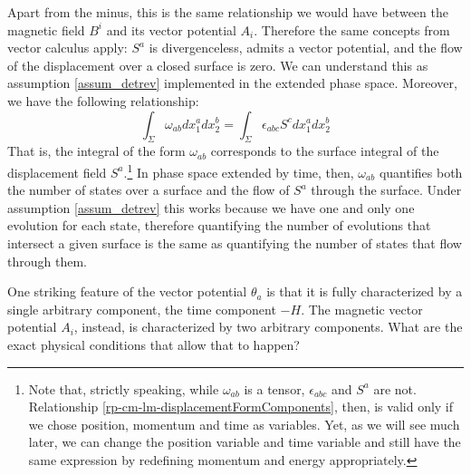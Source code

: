Apart from the minus, this is the same relationship we would have between the magnetic field $B^i$ and its vector potential $A_i$. Therefore the same concepts from vector calculus apply: $S^a$ is divergenceless, admits a vector potential, and the flow of the displacement over a closed surface is zero. We can understand this as assumption \ref{assum_detrev} implemented in the extended phase space. Moreover, we have the following relationship:
\begin{equation}
	\int_{\Sigma} \omega_{ab} dx_1^a dx_2^b = \int_{\Sigma} \epsilon_{abc}S^c dx_1^a dx_2^b
\end{equation}
That is, the integral of the form $\omega_{ab}$ corresponds to the surface integral of the displacement field $S^a$.\footnote{Note that, strictly speaking, while $\omega_{ab}$ is a tensor, $\epsilon_{abc}$ and $S^a$ are not. Relationship \ref{rp-cm-lm-displacementFormComponents}, then, is valid only if we chose position, momentum and time as variables. Yet, as we will see much later, we can change the position variable and time variable and still have the same expression by redefining momentum and energy appropriately.} In phase space extended by time, then, $\omega_{ab}$ quantifies both the number of states over a surface and the flow of $S^a$ through the surface. Under assumption \ref{assum_detrev} this works because we have one and only one evolution for each state, therefore quantifying the number of evolutions that intersect a given surface is the same as quantifying the number of states that flow through them.

One striking feature of the vector potential $\theta_a$ is that it is fully characterized by a single arbitrary component, the time component $-H$. The magnetic vector potential $A_i$, instead, is characterized by two arbitrary components. What are the exact physical conditions that allow that to happen?

